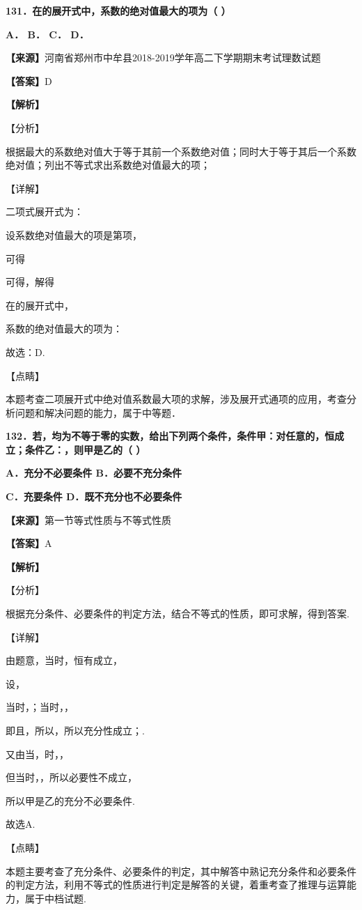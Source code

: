 \textbf{131．在的展开式中，系数的绝对值最大的项为（ ）}

\textbf{A． B． C． D．}

\textbf{【来源】}河南省郑州市中牟县2018-2019学年高二下学期期末考试理数试题

\textbf{【答案】}D

\textbf{【解析】}

【分析】

根据最大的系数绝对值大于等于其前一个系数绝对值；同时大于等于其后一个系数绝对值；列出不等式求出系数绝对值最大的项；

【详解】

二项式展开式为：

设系数绝对值最大的项是第项，

可得

可得，解得

在的展开式中，

系数的绝对值最大的项为：

故选：D.

【点睛】

本题考查二项展开式中绝对值系数最大项的求解，涉及展开式通项的应用，考查分析问题和解决问题的能力，属于中等题．

\textbf{132．若，均为不等于零的实数，给出下列两个条件，条件甲：对任意的，恒成立；条件乙：，则甲是乙的（
）}

\textbf{A．充分不必要条件 B．必要不充分条件}

\textbf{C．充要条件 D．既不充分也不必要条件}

\textbf{【来源】}第一节等式性质与不等式性质

\textbf{【答案】}A

\textbf{【解析】}

【分析】

根据充分条件、必要条件的判定方法，结合不等式的性质，即可求解，得到答案.

【详解】

由题意，当时，恒有成立，

设，

当时，；当时，，

即且，所以，所以充分性成立；.

又由当，时，，

但当时，，所以必要性不成立，

所以甲是乙的充分不必要条件.

故选A.

【点睛】

本题主要考查了充分条件、必要条件的判定，其中解答中熟记充分条件和必要条件的判定方法，利用不等式的性质进行判定是解答的关键，着重考查了推理与运算能力，属于中档试题.

